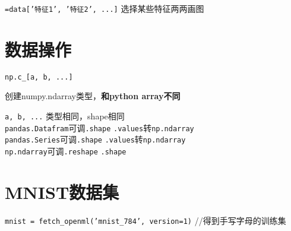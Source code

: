 \documentclass[UTF8]{ctexart}
\begin{document}
  \quad \texttt{=data['特征1', '特征2', ...]} 选择某些特征两两画图

\section{数据操作}
\noindent \texttt{np.c\_[a, b, ...]}

  创建numpy.ndarray类型，\textbf{和python array不同}

  \texttt{a, b, ...} 类型相同，shape相同\\
\texttt{pandas.Datafram}可调\texttt{.shape} \texttt{.values}转\texttt{np.ndarray}\\
\texttt{pandas.Series}可调\texttt{.shape} \texttt{.values}转\texttt{np.ndarray}\\
\texttt{np.ndarray}可调\texttt{.reshape} \texttt{.shape}

\section{MNIST数据集}
\noindent \texttt{mnist = fetch\_openml('mnist\_784', version=1)} //得到手写字母的训练集
\end{document}
